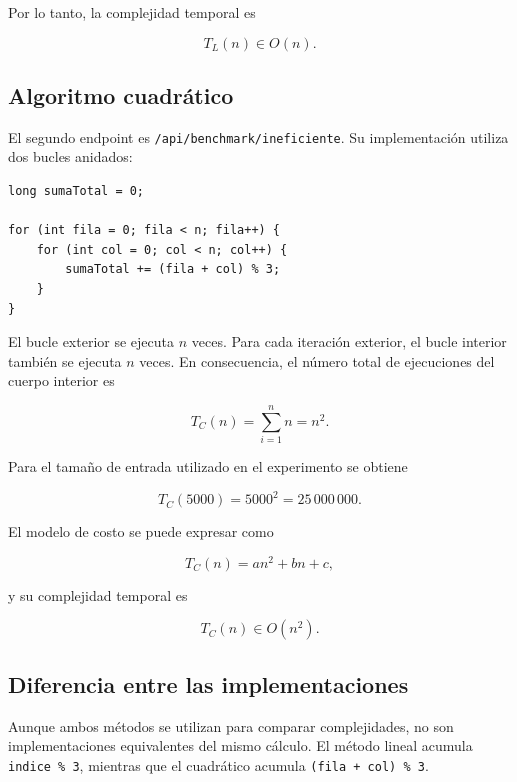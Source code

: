 \documentclass[runningheads]{llncs}
\begin{document}
Por lo tanto, la complejidad temporal es

\begin{equation}
\boxed{T_L(n)\in O(n)}.
\end{equation}

\subsection{Algoritmo cuadrático}

El segundo endpoint es
\texttt{/api/benchmark/ineficiente}. Su implementación
utiliza dos bucles anidados:

\begin{verbatim}
long sumaTotal = 0;

for (int fila = 0; fila < n; fila++) {
    for (int col = 0; col < n; col++) {
        sumaTotal += (fila + col) % 3;
    }
}
\end{verbatim}

El bucle exterior se ejecuta $n$ veces. Para cada
iteración exterior, el bucle interior también se
ejecuta $n$ veces. En consecuencia, el número total
de ejecuciones del cuerpo interior es

\begin{equation}
T_C(n)=\sum_{i=1}^{n} n=n^2.
\end{equation}

Para el tamaño de entrada utilizado en el
experimento se obtiene

\begin{equation}
T_C(5000)=5000^2=25\,000\,000.
\end{equation}

El modelo de costo se puede expresar como

\begin{equation}
T_C(n)=an^2+bn+c,
\end{equation}

y su complejidad temporal es

\begin{equation}
\boxed{T_C(n)\in O(n^2)}.
\end{equation}

\subsection{Diferencia entre las implementaciones}

Aunque ambos métodos se utilizan para comparar
complejidades, no son implementaciones equivalentes
del mismo cálculo. El método lineal acumula
\texttt{indice \% 3}, mientras que el cuadrático
acumula \texttt{(fila + col) \% 3}.
\end{document}
